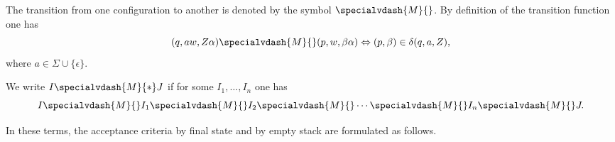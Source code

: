 

\setcounter{section}{6}
\setcounter{subsection}{2}
\setcounter{dfn}{6}


The transition from one configuration to another is denoted by the symbol $\specialvdash{M}{}$.
By definition of the transition function one has
\[
(q, aw, Z\alpha) \specialvdash{M}{} (p, w, \beta\alpha) \Leftrightarrow (p, \beta) \in \delta(q, a, Z),
\]
where $a \in \Sigma \cup \{\epsilon\}$.

We write $I \specialvdash{M}{*} J$ if for some $I_1, \ldots, I_n$ one has
\[
I \specialvdash{M}{} I_1 \specialvdash{M}{} I_2 \specialvdash{M}{} \cdots \specialvdash{M}{} I_n \specialvdash{M}{} J.
\]

In these terms, the acceptance criteria by final state and by empty stack are formulated as follows.



